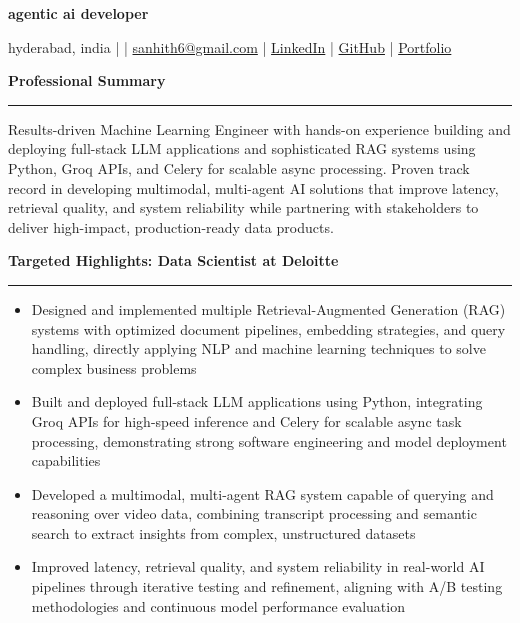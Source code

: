 \documentclass[9pt, letterpaper]{article}
\newcommand{\name}[1]{%
    \begin{center}
        {\LARGE \textbf{#1}}
    \end{center}
}
\newcommand{\sectionheading}[1]{%
    \vspace{4pt}%
    {\large \textbf{#1}}%
    \vspace{1pt}%
    \hrule
    \vspace{2pt}%
}
\begin{document}
\name{agentic ai developer}
\begin{center}
    hyderabad, india \quad |  \quad | \quad
    \href{mailto:sanhith6@gmail.com}{sanhith6@gmail.com} \quad | \quad
    \href{https://www.linkedin.com/in/sanhith-reddy-740a1625b/}{LinkedIn} \quad | \quad
    \href{https://github.com/tsanhith}{GitHub} \quad | \quad
    \href{https://johndoe.dev}{Portfolio}
\end{center}

\vspace{0pt}

\sectionheading{Professional Summary}
Results-driven Machine Learning Engineer with hands-on experience building and deploying full-stack LLM applications and sophisticated RAG systems using Python, Groq APIs, and Celery for scalable async processing. Proven track record in developing multimodal, multi-agent AI solutions that improve latency, retrieval quality, and system reliability while partnering with stakeholders to deliver high-impact, production-ready data products.

\sectionheading{Targeted Highlights: Data Scientist at Deloitte}
\begin{itemize}[leftmargin=0.25in, itemindent=-0.15in, label={--}]
    \item Designed and implemented multiple Retrieval-Augmented Generation (RAG) systems with optimized document pipelines, embedding strategies, and query handling, directly applying NLP and machine learning techniques to solve complex business problems
    \item Built and deployed full-stack LLM applications using Python, integrating Groq APIs for high-speed inference and Celery for scalable async task processing, demonstrating strong software engineering and model deployment capabilities
    \item Developed a multimodal, multi-agent RAG system capable of querying and reasoning over video data, combining transcript processing and semantic search to extract insights from complex, unstructured datasets
    \item Improved latency, retrieval quality, and system reliability in real-world AI pipelines through iterative testing and refinement, aligning with A/B testing methodologies and continuous model performance evaluation
\end{itemize}
\end{document}
